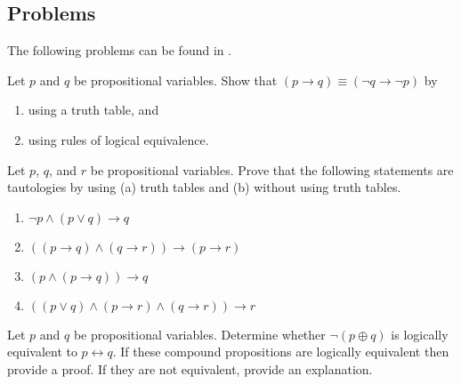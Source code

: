 \documentclass[../main.tex]{subfiles}
\begin{document}
\subsection{Problems}
The following problems can be found in \cite{rosen}.
\begin{homework}
    Let $p$ and $q$ be propositional variables. Show that $(p\to q)\equiv(\lnot q\to\lnot p)$ by
    \begin{enumerate}[label=(\alph*)]
        \item using a truth table, and
        \item using rules of logical equivalence.
    \end{enumerate}
\end{homework}
\begin{homework}
    Let $p$, $q$, and $r$ be propositional variables. Prove that the following statements are tautologies by using (a) truth tables and (b) without using truth tables.
    \begin{enumerate}[label=(\alph*)]
        \item $\neg p \land (p \lor q) \rightarrow q$
        \item $((p \rightarrow q) \land (q \rightarrow r)) \rightarrow (p \rightarrow r) $
        \item $(p \land (p \rightarrow q)) \rightarrow q$
        \item $((p \lor q) \land (p \rightarrow r) \land (q \rightarrow r)) \rightarrow r $
    \end{enumerate}
\end{homework}
\begin{homework} 
    Let $p$ and $q$ be propositional variables. Determine whether $\neg (p \oplus q)$ is logically equivalent to $p \leftrightarrow q$. If these compound propositions are logically equivalent then provide a proof. If they are not equivalent, provide an explanation.
\end{homework}
\end{document}
